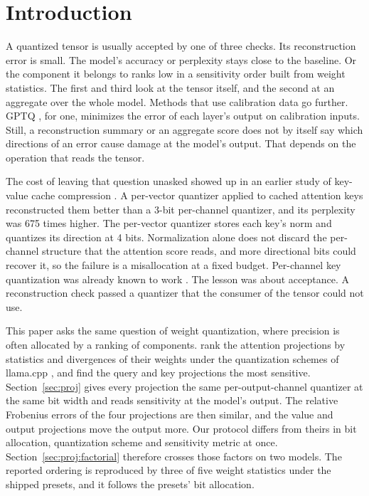 \documentclass[journal]{IEEEtran}
\newif\ifanon
\begin{document}
\section{Introduction}\label{sec:intro}

A quantized tensor is usually accepted by one of three checks. Its reconstruction error is
small. The model's accuracy or perplexity stays close to the baseline. Or the component it
belongs to ranks low in a sensitivity order built from weight statistics. The first and third
look at the tensor itself, and the second at an aggregate over the whole model. Methods that use
calibration data go further. GPTQ \citep{frantar2023gptq}, for one, minimizes the error of each
layer's output on calibration inputs. Still, a reconstruction summary or an aggregate score does
not by itself say which directions of an error cause damage at the model's output. That depends
on the operation that reads the tensor.

The cost of leaving that question unasked showed up in an earlier study of key-value cache compression
\ifanon\citep{anon2026overview}\else\citep{bond2026overview}\fi. A per-vector quantizer applied to cached attention keys
reconstructed them better than a 3-bit per-channel quantizer, and its perplexity was 675
times higher. The per-vector quantizer stores each key's norm and quantizes its direction at
4 bits. Normalization alone does not discard the per-channel structure that the attention
score reads, and more directional bits could recover it, so the failure is a misallocation at
a fixed budget. Per-channel key quantization was already known to work
\citep{liu2024kivi,hooper2024kvquant}. The lesson was about acceptance. A reconstruction check
passed a quantizer that the consumer of the tensor could not use.

This paper asks the same question of weight quantization, where precision is often allocated
by a ranking of components. \citet{rababah2026illusion} rank the attention projections by
statistics and divergences of their weights under the quantization schemes of llama.cpp
\citep{gerganov2023llamacpp}, and find the query and key projections the most sensitive.
Section~\ref{sec:proj} gives every projection the same per-output-channel quantizer at the
same bit width and reads sensitivity at the model's output. The relative Frobenius errors of
the four projections are then similar, and the value and output projections move the output
more. Our protocol differs from theirs in bit allocation, quantization scheme and sensitivity
metric at once. Section~\ref{sec:proj:factorial} therefore crosses those factors on two models.
The reported ordering is reproduced by three of five weight statistics under the shipped
presets, and it follows the presets' bit allocation.
\end{document}
